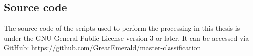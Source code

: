 \documentclass[a4paper,12pt]{scrbook}
\begin{document}
\begin{appendices}
 \chapter{Source code}
 The source code of the scripts used to perform the processing in this thesis is under the GNU General Public License version 3 or later. It can be accessed via GitHub: \url{https://github.com/GreatEmerald/master-classification}
 
\end{appendices}
\end{document}
